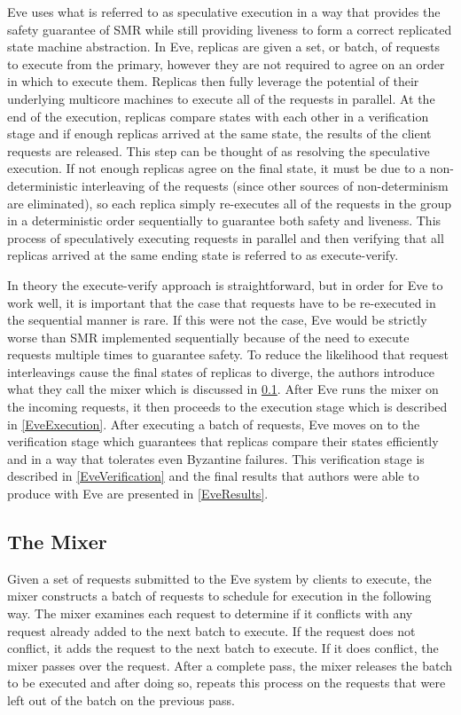 \documentclass[11pt, oneside]{report}
\begin{document}
Eve uses what is referred to as speculative execution in a way that provides the safety guarantee of SMR while still providing liveness to form a correct replicated state machine abstraction. 
In Eve, replicas are given a set, or batch, of requests to execute from the primary, however they are not required to agree on an order in which to execute them. 
Replicas then fully leverage the potential of their underlying multicore machines to execute all of the requests in parallel. 
At the end of the execution, replicas compare states with each other in a verification stage and if enough replicas arrived at the same state, the results of the client requests are released. 
This step can be thought of as resolving the speculative execution. 
If not enough replicas agree on the final state, it must be due to a non-deterministic interleaving of the requests (since other sources of non-determinism are eliminated), so each replica simply re-executes all of the requests in the group in a deterministic order sequentially to guarantee both safety and liveness. 
This process of speculatively executing requests in parallel and then verifying that all replicas arrived at the same ending state is referred to as execute-verify.

In theory the execute-verify approach is straightforward, but in order for Eve to work well, it is important that the case that requests have to be re-executed in the sequential manner is rare. 
If this were not the case, Eve would be strictly worse than SMR implemented sequentially because of the need to execute requests multiple times to guarantee safety. 
To reduce the likelihood that request interleavings cause the final states of replicas to diverge, the authors introduce what they call the mixer which is discussed in \ref{EveMixer}. 
After Eve runs the mixer on the incoming requests, it then proceeds to the execution stage which is described in \ref{EveExecution}. 
After executing a batch of requests, Eve moves on to the verification stage which guarantees that replicas compare their states efficiently and in a way that tolerates even Byzantine failures. 
This verification stage is described in \ref{EveVerification} and the final results that authors were able to produce with Eve are presented in \ref{EveResults}.

\subsection{The Mixer}\label{EveMixer}
Given a set of requests submitted to the Eve system by clients to execute, the mixer constructs a batch of requests to schedule for execution in the following way. 
The mixer examines each request to determine if it conflicts with any request already added to the next batch to execute. 
If the request does not conflict, it adds the request to the next batch to execute. 
If it does conflict, the mixer passes over the request. 
After a complete pass, the mixer releases the batch to be executed and after doing so, repeats this process on the requests that were left out of the batch on the previous pass.
\end{document}
